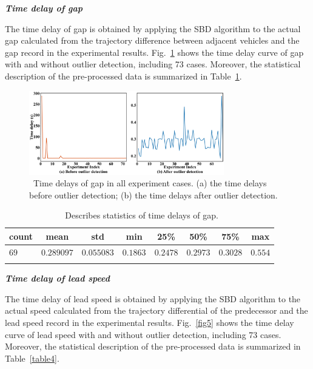 \documentclass[journal]{IEEEtran}
\begin{document}
\textbf{\emph{Time delay of gap}}

The time delay of gap is obtained by applying the SBD algorithm to the actual gap calculated from the trajectory difference between adjacent vehicles and the gap record in the experimental results. Fig.~\ref{fig4} shows the time delay curve of gap with and without outlier detection, including 73 cases. Moreover, the statistical description of the pre-processed data is summarized in Table~\ref{table3}.

\begin{figure}
  \centering
  \includegraphics[width=8.5cm]{figs/fig4.png}
  \caption{~Time delays of gap in all experiment cases. (a) the time delays before outlier detection; (b) the time delays after outlier detection.}
  \label{fig4}
\end{figure}

\begin{table}
  \centering
  \setlength{\abovecaptionskip}{0pt}
  \setlength{\belowcaptionskip}{10pt}%
  \caption{~Describes statistics of time delays of gap.}
  {\begin{tabular}{lccccccc} \toprule
      count & mean       & std        & min      & 25\%     & 50\%     & 75\%     & max     \\ \midrule
      $69$  & $0.289097$ & $0.055083$ & $0.1863$ & $0.2478$ & $0.2973$ & $0.3028$ & $0.554$ \\
      \bottomrule
      \label{table3}
    \end{tabular}}
\end{table}

\textbf{\emph{Time delay of lead speed}}

The time delay of lead speed is obtained by applying the SBD algorithm to the actual speed calculated from the trajectory differential of the predecessor and the lead speed record in the experimental results. Fig.~\ref{fig5} shows the time delay curve of lead speed with and without outlier detection, including 73 cases. Moreover, the statistical description of the pre-processed data is summarized in Table~\ref{table4}.
\end{document}
